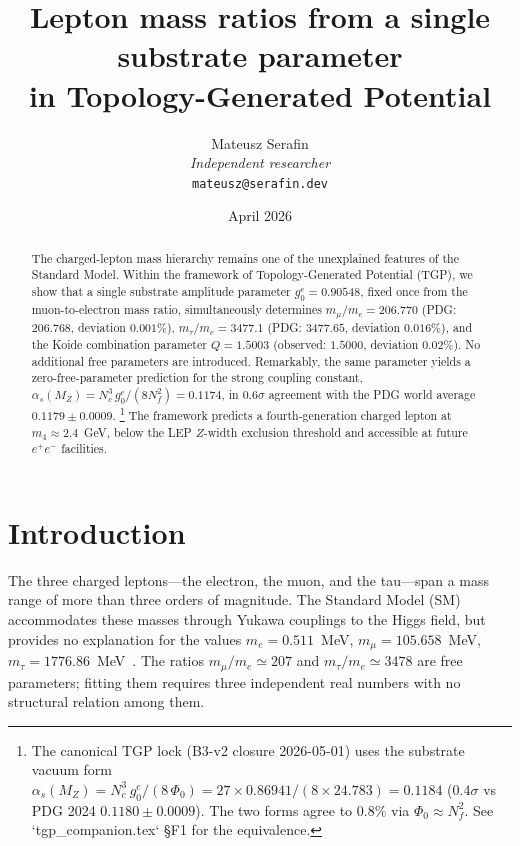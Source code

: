 \documentclass[11pt,a4paper]{article}
\title{Lepton mass ratios from a single substrate parameter\\in Topology-Generated Potential}
\author{Mateusz Serafin\\[4pt]
\textit{Independent researcher}\\
\texttt{mateusz@serafin.dev}}
\date{April 2026}
\newcommand{\gz}{g_0^e}
\newcommand{\as}{\alpha_s}
\newcommand{\MZ}{M_Z}
\newcommand{\mt}{m_\tau}
\newcommand{\mmu}{m_\mu}
\newcommand{\me}{m_e}
\newcommand{\Nc}{N_c}
\newcommand{\Nf}{N_f}
\begin{document}
\maketitle

\begin{abstract}
The charged-lepton mass hierarchy remains one of the unexplained features of the Standard Model.
Within the framework of Topology-Generated Potential (TGP), we show that a
single substrate amplitude parameter $\gz = 0.90548$, fixed once from the
muon-to-electron mass ratio, simultaneously determines
$\mmu/\me = 206.770$ (PDG: $206.768$, deviation $0.001\%$),
$\mt/\me = 3477.1$ (PDG: $3477.65$, deviation $0.016\%$),
and the Koide combination parameter $Q = 1.5003$ (observed: $1.5000$,
deviation $0.02\%$).
No additional free parameters are introduced.
Remarkably, the same parameter yields a zero-free-parameter prediction
for the strong coupling constant,
$\as(\MZ) = \Nc^{3}\,\gz/(8\Nf^{2}) = 0.1174$, in
$0.6\sigma$ agreement with the PDG world average $0.1179\pm 0.0009$.%
\footnote{The canonical TGP lock (B3-v2 closure 2026-05-01) uses the
substrate vacuum form
$\as(M_Z) = N_c^{3}\,g_0^e/(8\,\Phi_0) = 27 \times 0.86941 / (8 \times 24.783) = 0.1184$
($0.4\sigma$ vs PDG 2024 $0.1180\pm 0.0009$). The two forms agree to
$0.8\%$ via $\Phi_0 \approx N_f^{2}$. See `tgp\_companion.tex` \S F1
for the equivalence.}
The framework predicts a fourth-generation charged lepton at
$m_4 \approx 2.4$~GeV, below the LEP $Z$-width exclusion threshold
and accessible at future $e^+e^-$ facilities.
\end{abstract}

\section{Introduction}\label{sec:intro}

The three charged leptons---the electron, the muon, and the
tau---span a mass range of more than three orders of magnitude.
The Standard Model (SM) accommodates these masses through Yukawa
couplings to the Higgs field, but provides no explanation for the
values $\me = 0.511$~MeV, $\mmu = 105.658$~MeV,
$\mt = 1776.86$~MeV~\cite{PDG2024}. The ratios
$\mmu/\me \simeq 207$ and $\mt/\me \simeq 3478$ are free parameters;
fitting them requires three independent real numbers with no
structural relation among them.
\end{document}
